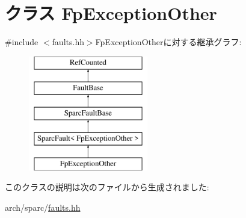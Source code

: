 \hypertarget{classSparcISA_1_1FpExceptionOther}{
\section{クラス FpExceptionOther}
\label{classSparcISA_1_1FpExceptionOther}
}


{\ttfamily \#include $<$faults.hh$>$}FpExceptionOtherに対する継承グラフ:\begin{figure}[H]
\begin{center}
\leavevmode
\includegraphics[height=5cm]{classSparcISA_1_1FpExceptionOther}
\end{center}
\end{figure}


このクラスの説明は次のファイルから生成されました:\begin{DoxyCompactItemize}
\item 
arch/sparc/\hyperlink{arch_2sparc_2faults_8hh}{faults.hh}\end{DoxyCompactItemize}
